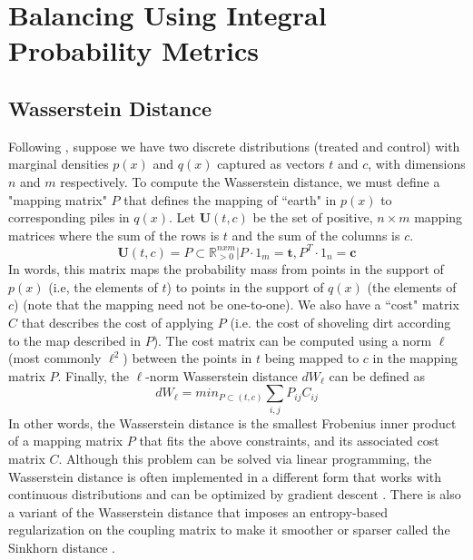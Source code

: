
\section{Balancing Using Integral Probability Metrics}
\label{appendix:cfrnet}
\subsection{Wasserstein Distance}
Following \citep{stockblog, dazablog}, suppose we have two discrete distributions (treated and control) with marginal densities $p(x)$ and $q(x)$ captured as vectors $t$ and $c$, with dimensions $n$ and $m$ respectively. To compute the Wasserstein distance, we must define a "mapping matrix" $P$ that defines the mapping of ``earth" in $p(x)$ to corresponding piles in $q(x)$. Let $\textbf{U}(t,c)$ be the set of positive, $n \times m$   mapping matrices where the sum of the rows is $t$ and the sum of the columns is $c$.  
\begin{equation}
\textbf{U}(t,c)= P\subset \mathbb{R}^{nxm}_{>0}| P \cdot 1_m=\textbf{t} , P^T \cdot 1_n=\textbf{c}
\end{equation} 
In words, this matrix maps the probability mass from points in the support of $p(x)$ (i.e, the elements of $t$) to points in the support of $q(x)$ (the elements of $c$) (note that the mapping need not be one-to-one). We also have a ``cost" matrix $C$ that describes the cost of applying $P$ (i.e. the cost of shoveling dirt according to the map described in $P$). The cost matrix can be computed using a norm $\ell$ (most commonly $\ell^2$) between the points in $t$ being mapped to $c$ in the mapping matrix $P$. Finally, the $\ell$-norm Wasserstein distance $dW_\ell$ can be defined as 
\begin{equation}
dW_\ell = min_{P\subset(t,c)}\sum_{i,j}P_{ij}C_{ij}
\end{equation}
In other words, the Wasserstein distance is the smallest Frobenius inner product of a mapping matrix $P$ that fits the above constraints, and its associated cost matrix $C$. Although this problem can be solved via linear programming, the Wasserstein distance is often implemented in a different form that works with continuous distributions and can be optimized by gradient descent \citep{arjovsky2017wasserstein,gulrajani2017improved}. There is also a variant of the Wasserstein distance that imposes an entropy-based regularization on the coupling matrix to make it smoother or sparser called the Sinkhorn distance \citep{cuturi2013sinkhorn}.

